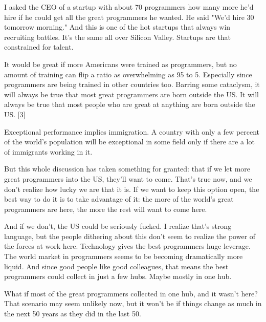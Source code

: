 I asked the CEO of a startup with about 70
                  programmers how many more he'd hire if he could get all the
                  great programmers he wanted. He said "We'd hire 30 tomorrow
                  morning." And this is one of the hot startups that always win
                  recruiting battles. It's the same all over Silicon Valley.
                  Startups are that constrained for talent.

It would
                  be great if more Americans were trained as programmers, but no
                  amount of training can flip a ratio as overwhelming as 95 to
                  5. Especially since programmers are being trained in other
                  countries too. Barring some cataclysm, it will always be true
                  that most great programmers are born outside the US. It will
                  always be true that most people who are great at anything are
                  born outside the US.
                  [\href{\#f3n}{3}]

Exceptional performance implies immigration. A
                  country with only a few percent of the world's population will
                  be exceptional in some field only if there are a lot of
                  immigrants working in it.

But this whole discussion
                  has taken something for granted: that if we let more great
                  programmers into the US, they'll want to come. That's true
                  now, and we don't realize how lucky we are that it is. If we
                  want to keep this option open, the best way to do it is to
                  take advantage of it: the more of the world's great
                  programmers are here, the more the rest will want to come
                  here.

And if we don't, the US could be seriously
                  fucked. I realize that's strong language, but the people
                  dithering about this don't seem to realize the power of the
                  forces at work here. Technology gives the best programmers
                  huge leverage. The world market in programmers seems to be
                  becoming dramatically more liquid. And since good people like
                  good colleagues, that means the best programmers could collect
                  in just a few hubs. Maybe mostly in one hub.

What
                  if most of the great programmers collected in one hub, and it
                  wasn't here? That scenario may seem unlikely now, but it won't
                  be if things change as much in the next 50 years as they did
                  in the last 50.


